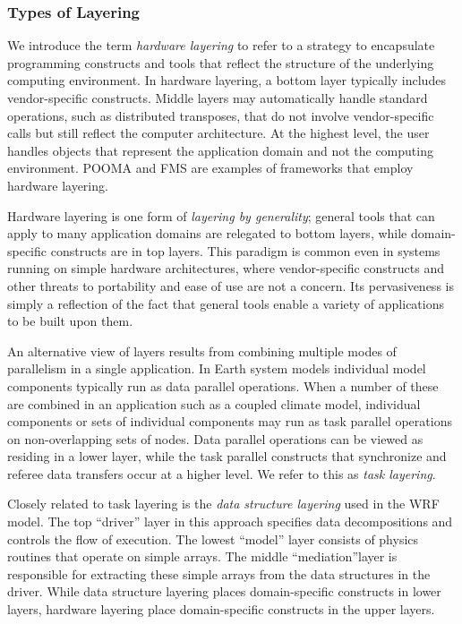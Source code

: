 \subsubsection{Types of Layering}
\label{sec:layering}

We introduce the term {\it hardware layering} to refer to a strategy to encapsulate 
programming constructs and tools that reflect the structure of the underlying 
computing environment.  In hardware layering, a bottom layer typically includes 
vendor-specific constructs.  Middle layers may automatically 
handle standard operations, such as distributed transposes, that do not involve  
vendor-specific calls but still reflect the computer architecture.  At the highest
level, the user handles objects that represent the application 
domain and not the computing environment.  POOMA \cite{pooma} and FMS \cite{fms} are examples of frameworks
that employ hardware layering.  

Hardware layering is one form of {\it layering by generality}; general 
tools that can apply to many application domains are relegated to bottom layers, 
while domain-specific constructs are in top layers.  This paradigm is
common even in systems running on simple hardware architectures, where 
vendor-specific
constructs and other threats to portability and ease of use are not a concern.
Its pervasiveness is simply a reflection of the fact that general tools 
enable a variety of applications to be built upon them.

An alternative view of layers results from combining multiple modes of parallelism 
in a single application.  In Earth system models individual model 
components typically run as data parallel 
operations.  When a number of 
these are combined in an application such as a coupled climate model, individual 
components or sets of individual components may run as task 
parallel operations 
on non-overlapping sets of nodes.  Data parallel operations can be viewed
as residing in a lower layer, while the task parallel constructs that 
synchronize and referee data transfers occur at a higher level. We refer to 
this as {\it task layering}.

Closely related to task layering is the {\it data structure layering} used 
in the WRF model.  The top ``driver'' layer 
in this approach specifies data decompositions and controls
the flow of execution.  The lowest ``model'' layer consists of physics routines that
operate on simple arrays.  The middle ``mediation''layer is responsible for 
extracting these simple arrays from the data structures in the driver.
While data structure layering places domain-specific constructs in lower layers, hardware 
layering place domain-specific constructs in the upper layers.  

